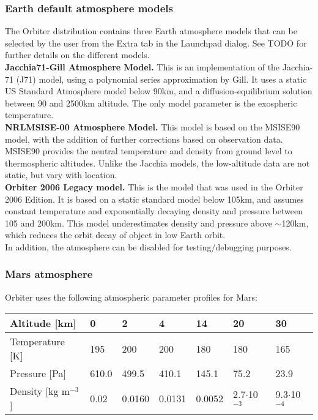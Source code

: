 \documentclass[Orbiter Developer Manual.tex]{subfiles}
\begin{document}
\subsubsection{Earth default atmosphere models}
The Orbiter distribution contains three Earth atmosphere models that can be selected by the user from the Extra tab in the Launchpad dialog. See TODO for further details on the different models.\\
\textbf{Jacchia71-Gill Atmosphere Model.} This is an implementation of the Jacchia-71 (J71) model\cite{jacchia71}, using a polynomial series approximation by Gill\cite{gill96}. It uses a static US Standard Atmosphere model below 90km, and a diffusion-equilibrium solution be­tween 90 and 2500km altitude. The only model parameter is the exospheric temperature.\\
\textbf{NRLMSISE-00 Atmosphere Model.} This model is based on the MSISE90 model, with the addition of further corrections based on observation data. MSISE90 provides the neutral temperature and density from ground level to thermospheric altitudes. Unlike the Jacchia models, the low-altitude data are not static, but vary with location.\\
\textbf{Orbiter 2006 Legacy model.} This is the model that was used in the Orbiter 2006 Edition. It is based on a static standard model\cite{anderson2000} below 105km, and assumes constant temperature and exponentially decaying density and pressure between 105 and 200km. This model underestimates density and pressure above $\sim$120km, which reduces the orbit decay of object in low Earth orbit.\\
In addition, the atmosphere can be disabled for testing/debugging purposes.

\subsubsection{Mars atmosphere}
Orbiter uses the following atmospheric parameter profiles for Mars:

	\begin{longtable}{ |p{}|p{}|p{}|p{}|p{}|p{}|p{}| }
	\hline\rule{0pt}{2ex}
	Altitude [km] & 0 & 2 & 4 & 14 & 20 & 30\\
	\hline\rule{0pt}{2ex}
	Temperature [K] & 195 & 200 & 200 & 180 & 180 & 165\\
	\hline\rule{0pt}{2ex}
	Pressure [Pa] & 610.0 & 499.5 & 410.1 & 145.1 & 75.2 & 23.9\\
	\hline\rule{0pt}{2ex}
	Density [kg m$^{-3}$] & 0.02 & 0.0160 & 0.0131 & 0.0052 & 2.7$\cdot$10$^{-3}$ & 9.3$\cdot$10$^{-4}$\\
	\hline
	\end{longtable}
\end{document}
